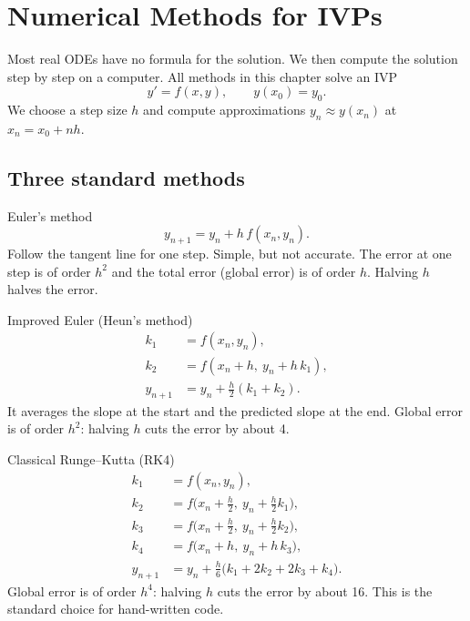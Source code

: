 \chapter{Numerical Methods for IVPs}

Most real ODEs have no formula for the solution. We then compute the solution step by step on a computer. All methods in this chapter solve an IVP
\[ y' = f(x,y), \qquad y(x_0) = y_0 . \]
We choose a step size $h$ and compute approximations $y_n \approx y(x_n)$ at $x_n = x_0 + nh$.

\section{Three standard methods}

\begin{methodbox}{Euler's method}
\[ y_{n+1} = y_n + h\,f(x_n, y_n). \]
Follow the tangent line for one step. Simple, but not accurate. The error at one step is of order $h^2$ and the total error (global error) is of order $h$. Halving $h$ halves the error.
\end{methodbox}

\begin{methodbox}{Improved Euler (Heun's method)}
\begin{align*}
k_1 &= f(x_n, y_n), \\
k_2 &= f(x_n + h,\ y_n + h\,k_1), \\
y_{n+1} &= y_n + \tfrac{h}{2}(k_1 + k_2).
\end{align*}
It averages the slope at the start and the predicted slope at the end. Global error is of order $h^2$: halving $h$ cuts the error by about 4.
\end{methodbox}

\begin{methodbox}{Classical Runge--Kutta (RK4)}
\begin{align*}
k_1 &= f(x_n, y_n), \\
k_2 &= f\big(x_n + \tfrac h2,\ y_n + \tfrac h2k_1\big), \\
k_3 &= f\big(x_n + \tfrac h2,\ y_n + \tfrac h2k_2\big), \\
k_4 &= f\big(x_n + h,\ y_n + h\,k_3\big), \\
y_{n+1} &= y_n + \tfrac{h}{6}\big(k_1 + 2k_2 + 2k_3 + k_4\big).
\end{align*}
Global error is of order $h^4$: halving $h$ cuts the error by about 16. This is the standard choice for hand-written code.
\end{methodbox}

